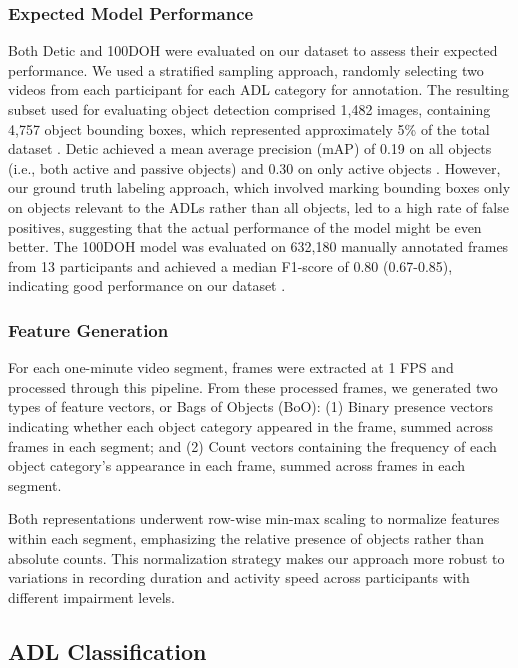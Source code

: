 \documentclass[journal,twoside,web]{ieeecolor}
\begin{document}
\subsubsection{Expected Model Performance}

Both Detic \cite{Zhou2022-fl} and 100DOH \cite{Shan2020-gh} were evaluated on our dataset to assess their expected performance. We used a stratified sampling approach, randomly selecting two videos from each participant for each ADL category for annotation. The resulting subset used for evaluating object detection comprised 1,482 images, containing 4,757 object bounding boxes, which represented approximately 5\% of the total dataset \cite{Kadambi2023-hx}. Detic achieved a mean average precision (mAP) of 0.19 on all objects (i.e., both active and passive objects) and 0.30 on only active objects \cite{Kadambi2023-hx}. However, our ground truth labeling approach, which involved marking bounding boxes only on objects relevant to the ADLs rather than all objects, led to a high rate of false positives, suggesting that the actual performance of the model might be even better. The 100DOH model \cite{Shan2020-gh} was evaluated on 632,180 manually annotated frames from 13 participants and achieved a median F1-score of 0.80 (0.67-0.85), indicating good performance on our dataset \cite{Bandini2022-rs}.

\subsubsection{Feature Generation}

For each one-minute video segment, frames were extracted at 1 FPS and processed through this pipeline. From these processed frames, we generated two types of feature vectors, or Bags of Objects (BoO): (1) Binary presence vectors indicating whether each object category appeared in the frame, summed across frames in each segment; and (2) Count vectors containing the frequency of each object category's appearance in each frame, summed across frames in each segment.

Both representations underwent row-wise min-max scaling to normalize features within each segment, emphasizing the relative presence of objects rather than absolute counts. This normalization strategy makes our approach more robust to variations in recording duration and activity speed across participants with different impairment levels.

\subsection{ADL Classification}
\end{document}
